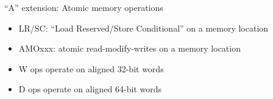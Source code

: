 \documentclass{article}
\begin{document}
\begin{center}
  {\Huge
    ``A'' extension: Atomic memory operations}

  \vspace{0.2in}


  \vspace{0.2in}

  \begin{minipage}[t]{6in}
    \begin{itemize}\Large
    \item LR/SC: ``Load Reserved/Store Conditional'' on a memory location
    \item AMOxxx: atomic read-modify-writes on a memory location
    \item W ops operate on aligned 32-bit words
    \item D ops operate on aligned 64-bit words
    \end{itemize}
  \end{minipage}
\end{center}

\clearpage

\end{document}
